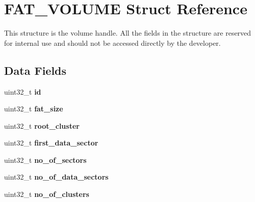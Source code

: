\hypertarget{struct_f_a_t___v_o_l_u_m_e}{\section{F\-A\-T\-\_\-\-V\-O\-L\-U\-M\-E Struct Reference}
\label{struct_f_a_t___v_o_l_u_m_e}
}


This structure is the volume handle. All the fields in the structure are reserved for internal use and should not be accessed directly by the developer.  


\subsection*{Data Fields}
\begin{DoxyCompactItemize}
\item 
\hypertarget{struct_f_a_t___v_o_l_u_m_e_ad9fc7be7a4f330749980a32b45e25301}{uint32\-\_\-t {\bfseries id}}\label{struct_f_a_t___v_o_l_u_m_e_ad9fc7be7a4f330749980a32b45e25301}

\item 
\hypertarget{struct_f_a_t___v_o_l_u_m_e_a05c8a4e5c32db92bf7a725b760f593f9}{uint32\-\_\-t {\bfseries fat\-\_\-size}}\label{struct_f_a_t___v_o_l_u_m_e_a05c8a4e5c32db92bf7a725b760f593f9}

\item 
\hypertarget{struct_f_a_t___v_o_l_u_m_e_a89b21b1e7239ad2d744f4720d2ec7582}{uint32\-\_\-t {\bfseries root\-\_\-cluster}}\label{struct_f_a_t___v_o_l_u_m_e_a89b21b1e7239ad2d744f4720d2ec7582}

\item 
\hypertarget{struct_f_a_t___v_o_l_u_m_e_a578b25f72bc909a3d7010583a8b23770}{uint32\-\_\-t {\bfseries first\-\_\-data\-\_\-sector}}\label{struct_f_a_t___v_o_l_u_m_e_a578b25f72bc909a3d7010583a8b23770}

\item 
\hypertarget{struct_f_a_t___v_o_l_u_m_e_a091263ffd1d98a6287ac413d4a089cff}{uint32\-\_\-t {\bfseries no\-\_\-of\-\_\-sectors}}\label{struct_f_a_t___v_o_l_u_m_e_a091263ffd1d98a6287ac413d4a089cff}

\item 
\hypertarget{struct_f_a_t___v_o_l_u_m_e_ae8dbd6da19f9b5d37c34de996e1ec6ad}{uint32\-\_\-t {\bfseries no\-\_\-of\-\_\-data\-\_\-sectors}}\label{struct_f_a_t___v_o_l_u_m_e_ae8dbd6da19f9b5d37c34de996e1ec6ad}

\item 
\hypertarget{struct_f_a_t___v_o_l_u_m_e_af5df802579642fc64be1572b74ff6caa}{uint32\-\_\-t {\bfseries no\-\_\-of\-\_\-clusters}}\label{struct_f_a_t___v_o_l_u_m_e_af5df802579642fc64be1572b74ff6caa}


\end{DoxyCompactItemize}
